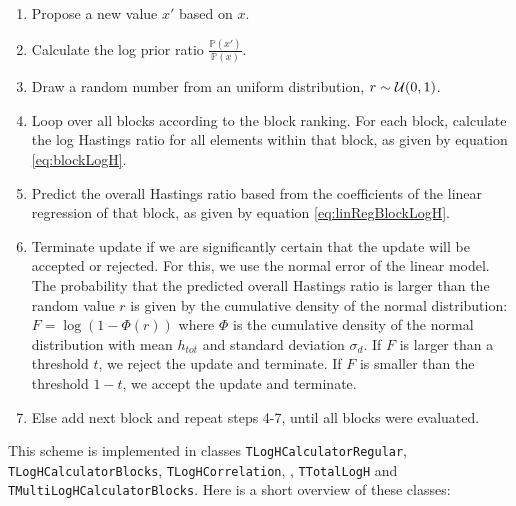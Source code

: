 \documentclass[a4paper,11pt]{article}
\def\p{\mathbb{P}}
\newcommand{\class}[1]{\texttt{#1}}
\begin{document}
\begin{enumerate}
 \item Propose a new value $x'$ based on $x$.
 \item Calculate the log prior ratio $\frac{\p(x')}{\p(x)}$.
 \item Draw a random number from an uniform distribution, $r \sim {\cal U}(0, 1)$.
 \item Loop over all blocks according to the block ranking. For each block, calculate the log Hastings ratio for all elements within that block, as given by equation \ref{eq:blockLogH}.
 \item Predict the overall Hastings ratio based from the coefficients of the linear regression of that block, as given by equation \ref{eq:linRegBlockLogH}.
 \item Terminate update if we are significantly certain that the update will be accepted or rejected. For this, we use the normal error of the linear model. The probability that the predicted overall Hastings ratio is larger than the random value $r$ is given by the cumulative density of the normal distribution: $F = \log(1 - \Phi(r))$ where $\Phi$ is the cumulative density of the normal distribution with mean $h_{tot}$ and standard deviation $\sigma_d$. If $F$ is larger than a threshold $t$, we reject the update and terminate. If $F$ is smaller than the threshold $1-t$, we accept the update and terminate.
 \item Else add next block and repeat steps 4-7, until all blocks were evaluated.
\end{enumerate}

This scheme is implemented in classes \class{TLogHCalculatorRegular}, \class{TLogHCalculatorBlocks}, \class{TLogHCorrelation}, , \class{TTotalLogH} and \class{TMultiLogHCalculatorBlocks}. Here is a short overview of these classes:
\end{document}

